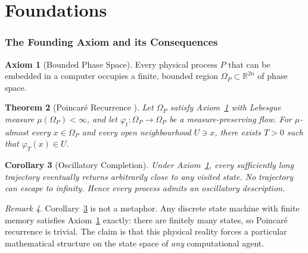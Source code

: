 \documentclass[twocolumn,11pt,a4paper]{article}
\theoremstyle{plain}
\newtheorem{theorem}{Theorem}[section]
\newtheorem{corollary}[theorem]{Corollary}
\theoremstyle{definition}
\newtheorem{axiom}[theorem]{Axiom}
\theoremstyle{remark}
\newtheorem{remark}[theorem]{Remark}
\newcommand{\R}{\mathbb{R}}
\begin{document}
\tableofcontents


\part{Foundations}

\section{The Founding Axiom and its Consequences}
\label{sec:axiom}

\begin{axiom}[Bounded Phase Space]
\label{ax:bounded}
Every physical process $P$ that can be embedded in a computer occupies a finite, bounded region $\Omega_P \subset \R^{2n}$ of phase space.
\end{axiom}

\begin{theorem}[Poincar\'e Recurrence \citep{poincare1890,walters1982}]
\label{thm:poincare}
Let $\Omega_P$ satisfy Axiom~\ref{ax:bounded} with Lebesgue measure $\mu(\Omega_P) < \infty$, and let $\varphi_t : \Omega_P \to \Omega_P$ be a measure-preserving flow.  For $\mu$-almost every $x \in \Omega_P$ and every open neighbourhood $U \ni x$, there exists $T > 0$ such that $\varphi_T(x) \in U$.
\end{theorem}

\begin{corollary}[Oscillatory Completion]
\label{cor:oscillatory}
Under Axiom~\ref{ax:bounded}, every sufficiently long trajectory eventually returns arbitrarily close to any visited state.  No trajectory can escape to infinity.  Hence every process admits an oscillatory description.
\end{corollary}

\begin{remark}
Corollary~\ref{cor:oscillatory} is not a metaphor.  Any discrete state machine with finite memory satisfies Axiom~\ref{ax:bounded} exactly: there are finitely many states, so Poincar\'e recurrence is trivial.  The claim is that this physical reality forces a particular mathematical structure on the state space of \emph{any} computational agent.
\end{remark}
\end{document}
